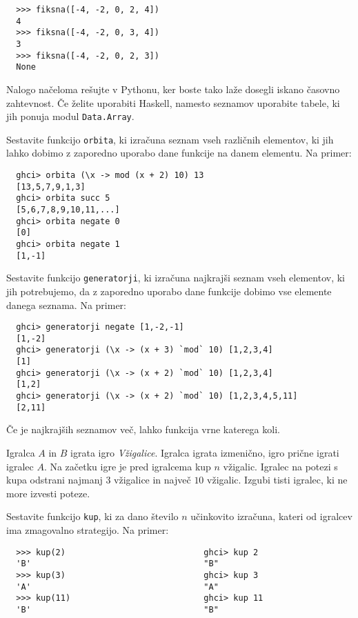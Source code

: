 \documentclass[arhiv]{../izpit}
\begin{document}
  \begin{verbatim}
  >>> fiksna([-4, -2, 0, 2, 4])
  4
  >>> fiksna([-4, -2, 0, 3, 4])
  3
  >>> fiksna([-4, -2, 0, 2, 3])
  None
  \end{verbatim}   
  Nalogo načeloma rešujte v Pythonu, ker boste tako laže dosegli iskano časovno
  zahtevnost. Če želite uporabiti Haskell, namesto seznamov uporabite tabele,
  ki jih ponuja modul \texttt{Data.Array}.


\podnaloga
  Sestavite funkcijo \texttt{orbita}, ki izračuna seznam vseh različnih
  elementov, ki jih lahko dobimo z zaporedno uporabo dane funkcije na danem
  elementu. Na primer:
  \begin{verbatim}
  ghci> orbita (\x -> mod (x + 2) 10) 13
  [13,5,7,9,1,3]
  ghci> orbita succ 5
  [5,6,7,8,9,10,11,...]
  ghci> orbita negate 0
  [0]
  ghci> orbita negate 1
  [1,-1]
  \end{verbatim}

\podnaloga
  Sestavite funkcijo \texttt{generatorji}, ki izračuna najkrajši seznam vseh
  elementov, ki jih potrebujemo, da z zaporedno uporabo dane funkcije dobimo
  vse elemente danega seznama. Na primer:
  \begin{verbatim}
  ghci> generatorji negate [1,-2,-1]
  [1,-2]
  ghci> generatorji (\x -> (x + 3) `mod` 10) [1,2,3,4]
  [1]
  ghci> generatorji (\x -> (x + 2) `mod` 10) [1,2,3,4]
  [1,2]
  ghci> generatorji (\x -> (x + 2) `mod` 10) [1,2,3,4,5,11]
  [2,11] 
  \end{verbatim}
  Če je najkrajših seznamov več, lahko funkcija vrne katerega koli.



Igralca $A$ in $B$ igrata igro {\em Vžigalice}. Igralca igrata
izmenično, igro prične igrati igralec $A$. Na začetku igre je pred igralcema
kup $n$ vžigalic. Igralec na potezi s kupa odstrani najmanj $3$ vžigalice 
in največ $10$ vžigalic. Izgubi tisti igralec, ki ne more izvesti poteze.

\podnaloga
  Sestavite funkcijo \texttt{kup}, ki za dano število $n$ učinkovito izračuna,
  kateri od igralcev ima zmagovalno strategijo. Na primer:
  \begin{verbatim}
  >>> kup(2)                            ghci> kup 2 
  'B'                                   "B"
  >>> kup(3)                            ghci> kup 3 
  'A'                                   "A"
  >>> kup(11)                           ghci> kup 11 
  'B'                                   "B"
  \end{verbatim}
\end{document}
